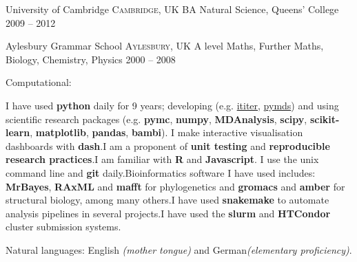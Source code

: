 \documentclass[10pt,a4paper]{article}
\begin{document}
\headedsection
{University of Cambridge}
{\textsc{Cambridge, UK}} {%
  \headedsubsection
  {BA Natural Science, Queens' College}
  {2009 -- 2012}
  {
  }
}

\headedsection
{Aylesbury Grammar School}
{\textsc{Aylesbury, UK}} {
  \headedsubsection
  {A level Maths, Further Maths, Biology, Chemistry, Physics}
  {2000 -- 2008}
  {}
}

\spacedhrule{0.9em}{-0.4em}


\inlineheadsection  %
{Computational:} {
  
  I have used \textbf{python} daily for 9 years; developing (e.g.\@
  \href{https://ititer.readthedocs.io/}{ititer},
  \href{https://pymds.readthedocs.io}{pymds}) and using scientific research
  packages (e.g. \textbf{pymc}, \textbf{numpy}, \textbf{MDAnalysis},
  \textbf{scipy}, \textbf{scikit-learn}, \textbf{matplotlib}, \textbf{pandas},
  \textbf{bambi}). I make interactive visualisation dashboards with
  \textbf{dash}.\sbull I am a proponent of \textbf{unit testing} and
  \textbf{reproducible research practices}.\sbull I am familiar with \textbf{R}
  and \textbf{Javascript}. \sbull I use the unix command line and \textbf{git}
  daily.\sbull Bioinformatics software I have used includes: \textbf{MrBayes},
  \textbf{RAxML} and \textbf{mafft} for phylogenetics and \textbf{gromacs} and
  \textbf{amber} for structural biology, among many others.\sbull I have used
  \textbf{snakemake} to automate analysis pipelines in several projects.\sbull I
  have used the \textbf{slurm} and \textbf{HTCondor} cluster submission systems.}

\vspace{0.5em}
\inlineheadsection
{Natural languages:}
{English \emph{(mother tongue)} and German\emph{(elementary proficiency)}.}


\spacedhrule{1.6em}{-0.4em}


\inlineheadsection
{}
{
  \renewcommand{\bibsection}{(See this list on {\href{https://scholar.google.co.uk/citations?user=q260RVcAAAAJ&hl=en}{Google scholar.)}}}
  \nocite{*}
  
}

\spacedhrule{1.6em}{-0.4em}


\end{document}
